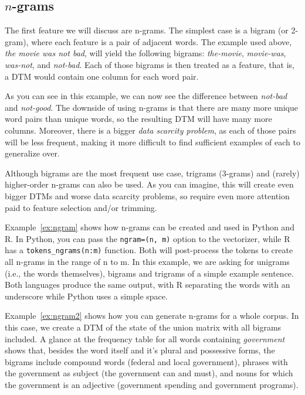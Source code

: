 \subsection{$n$-grams}
The first feature we will discuss are n-grams.
The simplest case is a bigram (or 2-gram), where each feature is a pair of adjacent words.
The example used above, \emph{the movie was not bad}, will yield the following bigrams: \emph{the-movie}, \emph{movie-was}, \emph{was-not}, and \emph{not-bad}.
Each of those bigrams is then treated as a feature, that is, a DTM would contain one column for each word pair.

As you can see in this example, we can now see the difference between \emph{not-bad} and \emph{not-good}.
The downside of using n-grams is that there are many more unique word pairs than unique words,
so the resulting DTM will have many more columns.
Moreover, there is a bigger \emph{data scarcity problem}, as each of those pairs will be less frequent,
making it more difficult to find sufficient examples of each to generalize over.

Although bigrams are the most frequent use case, trigrams (3-grams) and (rarely) higher-order n-grams can also be used.
As you can imagine, this will create even bigger DTMs and worse data scarcity problems,
so require even more attention paid to feature selection and/or trimming.



Example~\ref{ex:ngram} shows how n-grams can be created and used in Python and R.
In Python, you can pass the \verb|ngram=(n, m)| option to the vectorizer,
while R has a \verb|tokens_ngrams(n:m)| function.
Both will post-process the tokens to create all n-grams in the range of n to m.
In this example, we are asking for unigrams (i.e., the words themselves), bigrams and trigrams of a simple example sentence.
Both languages produce the same output, with R separating the words with an underscore while Python uses a simple space.


Example~\ref{ex:ngram2} shows how you can generate n-grams for a whole corpus.
In this case, we create a DTM of the state of the union matrix with all bigrams included.
A glance at the frequency table for all words containing \emph{government} shows that,
besides the word itself and it's plural and possessive forms, the bigrams include compound words (federal and local government),
phrases with  the government as subject (the government can and must), and nouns for which the government is an adjective
(government spending and government programs).

